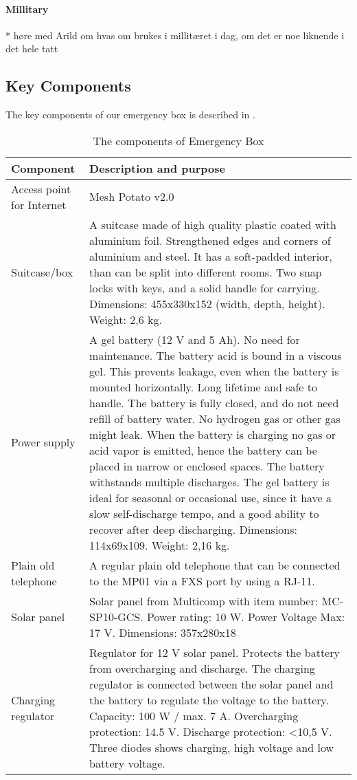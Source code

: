 \paragraph{Millitary}
* høre med Arild om hvas om brukes i millitæret i dag, om det er noe liknende i det hele tatt

\subsection{Key Components}
The key components of our emergency box is described in . 

\begin{center}
\begin{table}[h!]
\caption{\label{tab:components}The components of Emergency Box}
    \begin{tabular}{ | l | p{9cm} |}
    \hline
    \textbf{Component} & \textbf{Description and purpose} \\ 
    \hline
    Access point for Internet &  Mesh Potato v2.0\\ 
    \hline
    Suitcase/box &  A suitcase made of high quality plastic coated with aluminium foil. Strengthened edges and corners of aluminium and steel. It has a soft-padded interior, than can be split into different rooms. Two snap locks with keys, and a solid handle for carrying. Dimensions: 455x330x152 (width, depth, height). Weight: 2,6 kg. \\ 
    \hline
    Power supply & A gel battery (12 V and 5 Ah). No need for maintenance. The battery acid is bound in a viscous gel. This prevents leakage, even when the battery is mounted horizontally. Long lifetime and safe to handle. The battery is fully closed, and do not need refill of battery water. No hydrogen gas or other gas might leak. When the battery is charging no gas or acid vapor is emitted, hence the battery can be placed in narrow or enclosed spaces. The battery withstands multiple discharges. The gel battery is ideal for seasonal or occasional use, since it have a slow self-discharge tempo, and a good ability to recover after deep discharging. Dimensions: 114x69x109. Weight: 2,16 kg. \\
    \hline
    Plain old telephone &  A regular plain old telephone that can be connected to the MP01 via a FXS port by using a RJ-11. \\
	\hline
	Solar panel & Solar panel from Multicomp with item number: MC-SP10-GCS. Power rating: 10 W. Power Voltage Max: 17 V. Dimensions: 357x280x18\\
	\hline
	Charging regulator & Regulator for 12 V solar panel. Protects the battery from overcharging and discharge. The charging regulator is connected between the solar panel and the battery to regulate the voltage to the battery. Capacity: 100 W / max. 7 A. Overcharging protection: 14.5 V. Discharge protection: <10,5 V. Three diodes shows charging, high voltage and low battery voltage. \\
	\hline
    \end{tabular}
   \end{table}
\end{center}

